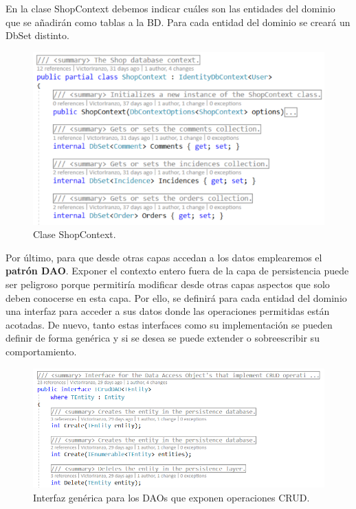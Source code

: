 \documentclass[11pt,spanish,listoffigures]{tfgetsinf}
\begin{document}
En la clase ShopContext debemos indicar cuáles son las entidades del dominio que se añadirán como tablas a la BD. Para cada entidad del dominio se creará un DbSet distinto.

\begin{figure}[h]
\centering
\includegraphics[scale=0.8]{ShopContext}
\caption{Clase ShopContext.}
\end{figure}

Por último, para que desde otras capas accedan a los datos emplearemos el \textbf{patrón DAO}. Exponer el contexto entero fuera de la capa de persistencia puede ser peligroso porque permitiría modificar desde otras capas aspectos que solo deben conocerse en esta capa. Por ello, se definirá para cada entidad del dominio una interfaz para acceder a sus datos donde las operaciones permitidas están acotadas. De nuevo, tanto estas interfaces como su implementación se pueden definir de forma genérica y si se desea se puede extender o sobreescribir su comportamiento.

\begin{figure}[h]
\centering
\includegraphics[scale=0.8]{ICrudDAO}
\caption{Interfaz genérica para los DAOs que exponen operaciones CRUD.}
\end{figure}
\end{document}

